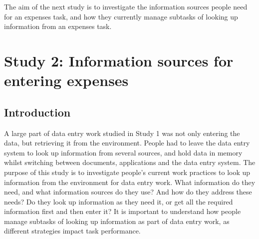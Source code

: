 The aim of the next study is to investigate the information sources people need for an expenses task, and how they currently manage subtasks of looking up information from an expenses task. 

\section{Study 2: Information sources for entering expenses}

\subsection{Introduction}
A large part of data entry work studied in Study 1 was not only entering the data, but retrieving it from the environment. People had to leave the data entry system to look up information from several sources, and hold data in memory whilst switching between documents, applications and the data entry system. 
The purpose of this study is to investigate people's current work practices to look up information from the environment for data entry work. What information do they need, and what information sources do they use? And how do they address these needs? Do they look up information as they need it, or get all the required information first and then enter it? It is important to understand how people manage subtasks of looking up information as part of data entry work, as different strategies impact task performance. 

